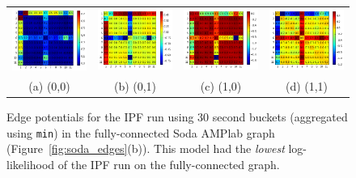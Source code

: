 \begin{figure}[ht]
\centering
\begin{tabular}{cccc}
\includegraphics[width=1.3in]{figs/30secmin00fullconf} & \includegraphics[width=1.3in]{figs/30secmin01fullconf} & \includegraphics[width=1.3in]{figs/30secmin10fullconf} & \includegraphics[width=1.3in]{figs/30secmin11fullconf} \\
(a) (0,0) & (b) (0,1) & (c) (1,0) & (d) (1,1) \\[6pt]
\end{tabular}
\caption{Edge potentials for the IPF run using 30 second buckets (aggregated using \texttt{min}) in the fully-connected Soda AMPlab graph (Figure~\ref{fig:soda_edges}(b)). This model had the \emph{lowest} log-likelihood of the IPF run on the fully-connected graph.}
\label{fig:30secminfull}
\end{figure}

